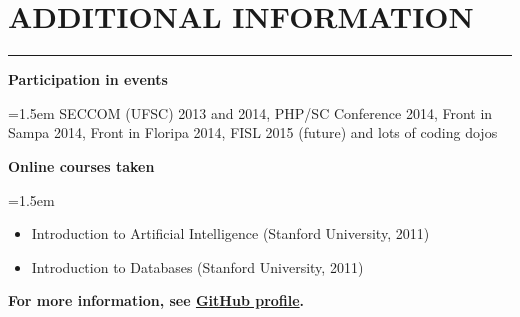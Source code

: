 \documentclass{article}
\newcommand{\additionalentry}[2]{%
	\noindent \textbf{#1} \par
	\noindent \hangindent=1.5em \hangafter=0 \small #2 \par
	\normalsize
	\vspace{1em}
}
\newenvironment{main}{%
\noindent
\begin{minipage}[t]{\dimexpr0.75\textwidth-2em}%
\let\oldsection\section
\renewcommand{\section}[1]{\oldsection*{\uppercase{##1}}\vspace{-0.5em}\hrule\vspace{1em}}
}{%
\let\section\oldsection
\end{minipage}%
}
\begin{document}
\begin{main}
\section{Additional Information}
\additionalentry{Participation in events}{SECCOM (UFSC) 2013 and 2014, PHP/SC Conference 2014, Front in Sampa 2014, Front in Floripa 2014, FISL 2015 (future) and lots of coding dojos}

\additionalentry{Online courses taken}{\begin{itemize}
\item{Introduction to Artificial Intelligence (Stanford University, 2011)}
\item{Introduction to Databases (Stanford University, 2011)}
\end{itemize}}

\textbf{For more information, see \href{https://github.com/ranisalt}{GitHub profile}.}


\end{main}%
\end{document}
